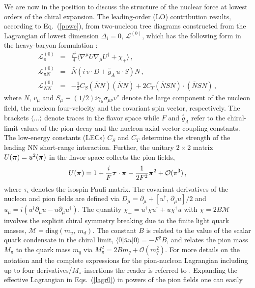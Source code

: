 \documentclass[aps,rmp,nofootinbib,twocolumn,floatfix]{revtex4}
\newcommand{\krig}[1]{\stackrel{\circ}{#1}}
\newcommand{\beq}{\begin{equation}}
\newcommand{\eeq}{\end{equation}}
\newcommand{\beqa}{\begin{eqnarray}}
\newcommand{\eeqa}{\end{eqnarray}}
\newcommand{\fet}[1]{\mbox{\boldmath $#1$}}
\newcommand{\nn}{\nonumber \\ }
\begin{document}
We are now in the position to discuss the structure of the nuclear force
at lowest orders of the chiral expansion. 
The leading-order (LO) contribution results, according to Eq.~(\ref{powc}),
from two-nucleon tree diagrams constructed from the Lagrangian of lowest dimension
$\Delta_i=0$, $\mathcal{L}^{(0)}$, which has the following form in the heavy-baryon
formulation \cite{Jenkins:1990jv,Bernard:1992qa}:
\beqa
\label{lagr0}
\mathcal{L}_{\pi}^{(0)} &=& \frac{F^2}{4} \langle \nabla^\mu U \nabla_\mu 
U^\dagger + \chi_+ \rangle \,, \\
\mathcal{L}_{\pi N}^{(0)} &=& \bar{N} \left(
 i \, v\cdot D + \krig{g}_A \, u \cdot S \right) N\,,\nn
\mathcal{L}_{NN}^{(0)} &=& -\frac{1}{2} C_S ( \bar N N)   ( \bar N N )  +
2 C_T  ( \bar N S N ) 
\cdot ( \bar N S N ) \,, 
\nonumber
\eeqa
where $N$, $v_\mu$  and  $S_\mu \equiv ( 1/2)  i \gamma_5 \sigma_{\mu \nu} v^\nu$
denote the large component of the nucleon
field, the nucleon four-velocity and the covariant spin vector, respectively.  
The brackets $\langle \ldots \rangle$ denote traces in the flavor space
while $F$ and $\krig{g}_A$ refer to the chiral-limit values of the pion decay
and the nucleon axial vector coupling constants. 
The low-energy constants (LECs)
$C_S$ and $C_T$ determine the strength of the leading NN short-range
interaction. 
Further, the unitary $2 \times 2$ matrix $U( \fet \pi ) = u^2( \fet \pi )$ in
the flavor space collects the pion fields, 
\beq
U (\fet \pi ) = 1 + \frac{i}{F} \fet \tau \cdot \fet \pi - 
\frac{1}{2 F^2} \fet \pi^2 + \mathcal{O} (\pi^3)\,,
\eeq
where $\tau_i$ denotes the isospin Pauli matrix. 
The covariant derivatives of the nucleon and pion fields are defined via
$D_\mu = \partial_\mu + [ u^\dagger , \, \partial_\mu u ]/2$ and 
$u_\mu = i(u^\dagger \partial_\mu u
- u \partial_\mu u^\dagger)$. The quantity $\chi_+ = u^\dagger \chi u^\dagger + u
\chi^\dagger u$ with $\chi =2 B \mathcal{M}$ involves the explicit chiral
symmetry breaking due to the finite light quark masses, $\mathcal{M} =
\mbox{diag} (m_u ,\, m_d )$. The constant $B$ is related to the value of the
scalar quark condensate in the chiral limit, $\langle 0 | \bar u u | 0 \rangle
= -F^2 B$, and relates the pion mass $M_\pi$ to the quark mass $m_q$ via
$M_\pi^2 = 2 B m_q + \mathcal{O} (m_q^2 )$.  For more details on the notation
and the complete expressions for the pion-nucleon Lagrangian including up to
four derivatives/$M_\pi$-insertions the reader is referred to \cite{Fettes:2000gb}.
Expanding the effective
Lagrangian in Eqs.~(\ref{lagr0}) in powers of the pion fields one can easily
\end{document}
